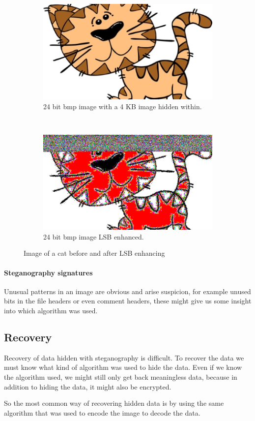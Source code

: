\begin{figure}
    \centering
    \begin{subfigure}[b]{0.45\textwidth}
		\includegraphics[width=\textwidth]{figures/cat.jpg}
		\caption{24 bit bmp image with a 4 KB image hidden within. \citep{imgCat}}
		\label{fig:hiddenAAU}
	\end{subfigure}
	~
	\begin{subfigure}[b]{0.45\textwidth}
		\includegraphics[width=\textwidth]{figures/Cat_LSBEnhanced.png}
		\caption{24 bit bmp image LSB enhanced. \newline}
		\label{fig:LSBenhanced}
	\end{subfigure}
	\caption{Image of a cat before and after LSB enhancing}
\end{figure}

\paragraph*{Steganography signatures}
Unusual patterns in an image are obvious and arise suspicion, for example unused bits in the file headers or even comment headers, these might give us some insight into which algorithm was used.

\subsection{Recovery}
Recovery of data hidden with steganography is difficult. To recover the data we must know what kind of algorithm was used to hide the data.
Even if we know the algorithm used, we might still only get back meaningless data, because in addition to hiding the data, it might also be encrypted.

So the most common way of recovering hidden data is by using the same algorithm that was used to encode the image to decode the data.
